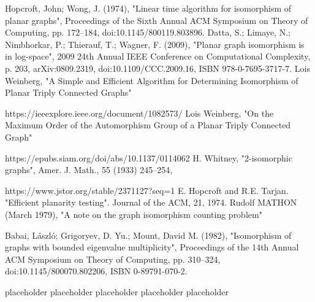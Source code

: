 \begin{thebibliography}{99}
     Hopcroft, John; Wong, J. (1974), 
    "Linear time algorithm for isomorphism of planar graphs", 
    Proceedings of the Sixth Annual ACM Symposium on Theory of Computing, 
    pp. 172–184, doi:10.1145/800119.803896.
     Datta, S.; Limaye, N.; Nimbhorkar, P.; Thierauf, T.; Wagner, F. (2009), 
    "Planar graph isomorphism is in log-space", 
    2009 24th Annual IEEE Conference on Computational Complexity, 
    p. 203, arXiv:0809.2319, doi:10.1109/CCC.2009.16, ISBN 978-0-7695-3717-7.
     Lois Weinberg,
    "A Simple and Efficient Algorithm for Determining Isomorphism  of Planar Triply Connected Graphs"
    
    https://ieeexplore.ieee.org/document/1082573/
     Lois Weinberg,
    "On the Maximum Order of the Automorphism Group of a Planar Triply Connected Graph"
    
    https://epubs.siam.org/doi/abs/10.1137/0114062
      H. Whitney, 
    "2-isomorphic graphs",  
    Amer. J. Math., 55 (1933) 245–254, 

    https://www.jstor.org/stable/2371127?seq=1
     E. Hopcroft and R.E. Tarjan. 
    "Efficient planarity testing".
    Journal of the ACM, 21, 1974.
     Rudolf MATHON (March 1979),
    "A note on the graph isomorphism counting problem"

     Babai, László; Grigoryev, D. Yu.; Mount, David M. (1982), 
    "Isomorphism of graphs with bounded eigenvalue multiplicity", 
    Proceedings of the 14th Annual ACM Symposium on Theory of Computing, 
    pp. 310–324, doi:10.1145/800070.802206, ISBN 0-89791-070-2.
    
    \bibitem{} placeholder
    \bibitem{} placeholder
    \bibitem{} placeholder
    \bibitem{} placeholder
    \bibitem{} placeholder
\end{thebibliography}